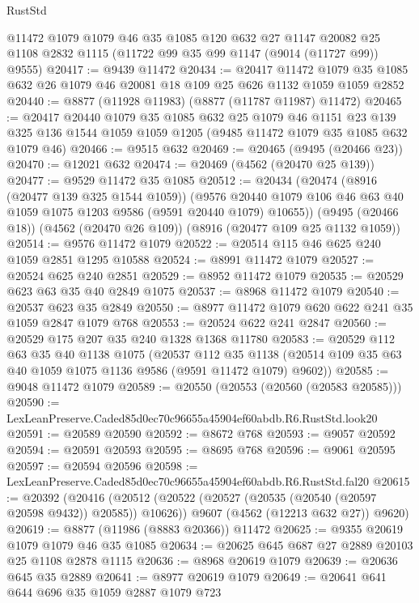 \begin{lexlean}{RustStd}
\begin{coremodule}
    @11472
    @1079
    @1079
    @46
    @35
    @1085
    @120
    @632
    @27
    @1147
    @20082
    @25
    @1108
    @2832
    @1115
    (@11722 @99 @35 @99 @1147 (@9014 (@11727 @99)) @9555)
@20417 := @9439 @11472
@20434 := @20417
    @11472
    @1079
    @35
    @1085
    @632
    @26
    @1079
    @46
    @20081
    @18
    @109
    @25
    @626
    @1132
    @1059
    @1059
    @2852
@20440 := @8877 (@11928 @11983) (@8877 (@11787 @11987) @11472)
@20465 := @20417
    @20440
    @1079
    @35
    @1085
    @632
    @25
    @1079
    @46
    @1151
    @23
    @139
    @325
    @136
    @1544
    @1059
    @1059
    @1205
    (@9485 @11472 @1079 @35 @1085 @632 @1079 @46)
@20466 := @9515 @632
@20469 := @20465 (@9495 (@20466 @23))
@20470 := @12021 @632
@20474 := @20469 (@4562 (@20470 @25 @139))
@20477 := @9529 @11472 @35 @1085
@20512 := @20434
    (@20474
      (@8916 (@20477 @139 @325 @1544 @1059))
      (@9576 @20440 @1079 @106 @46 @63 @40 @1059 @1075 @1203 @9586 (@9591 @20440 @1079) @10655))
    (@9495 (@20466 @18))
    (@4562 (@20470 @26 @109))
    (@8916 (@20477 @109 @25 @1132 @1059))
@20514 := @9576 @11472 @1079
@20522 := @20514 @115 @46 @625 @240 @1059 @2851 @1295 @10588
@20524 := @8991 @11472 @1079
@20527 := @20524 @625 @240 @2851
@20529 := @8952 @11472 @1079
@20535 := @20529 @623 @63 @35 @40 @2849 @1075
@20537 := @8968 @11472 @1079
@20540 := @20537 @623 @35 @2849
@20550 := @8977 @11472 @1079 @620 @622 @241 @35 @1059 @2847 @1079 @768
@20553 := @20524 @622 @241 @2847
@20560 := @20529 @175 @207 @35 @240 @1328 @1368 @11780
@20583 := @20529
    @112
    @63
    @35
    @40
    @1138
    @1075
    (@20537
      @112
      @35
      @1138
      (@20514 @109 @35 @63 @40 @1059 @1075 @1136 @9586 (@9591 @11472 @1079) @9602))
@20585 := @9048 @11472 @1079
@20589 := @20550 (@20553 (@20560 (@20583 @20585)))
@20590 := LexLeanPreserve.Caded85d0ec70c96655a45904ef60abdb.R6.RustStd.look20
@20591 := @20589 @20590
@20592 := @8672 @768
@20593 := @9057 @20592
@20594 := @20591 @20593
@20595 := @8695 @768
@20596 := @9061 @20595
@20597 := @20594 @20596
@20598 := LexLeanPreserve.Caded85d0ec70c96655a45904ef60abdb.R6.RustStd.fal20
@20615 := @20392
    (@20416
      (@20512 (@20522 (@20527 (@20535 (@20540 (@20597 @20598 @9432)) @20585)) @10626))
      @9607
      (@4562 (@12213 @632 @27))
      @9620)
@20619 := @8877 (@11986 (@8883 @20366)) @11472
@20625 := @9355 @20619 @1079 @1079 @46 @35 @1085
@20634 := @20625 @645 @687 @27 @2889 @20103 @25 @1108 @2878 @1115
@20636 := @8968 @20619 @1079
@20639 := @20636 @645 @35 @2889
@20641 := @8977 @20619 @1079
@20649 := @20641 @641 @644 @696 @35 @1059 @2887 @1079 @723

\end{coremodule}
\end{lexlean}
